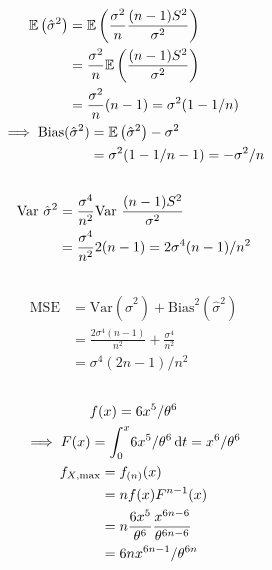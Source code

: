 \documentclass[twocolumn]{article}
\numberwithin{equation}{section}
\begin{document}
\begin{gather*}
\begin{aligned}
\mathbb{E}\left(\hat{\sigma}^2\right)
&=\mathbb{E}\left(\frac{\sigma^2}{n}\frac{(n-1)S^2}{\sigma^2}\right)\\
&=\frac{\sigma^2}{n}\mathbb{E}\left(\frac{(n-1)S^2}{\sigma^2}\right)\\
&=\frac{\sigma^2}{n}(n-1)=\sigma^2(1-1/n)
\end{aligned}\\
\begin{aligned}
\implies \mathrm{Bias}(\hat\sigma^2)&=\mathbb{E}\left(\hat\sigma^2\right)-\sigma^2\\
&=\sigma^2(1-1/n-1)=-\sigma^2/n
\end{aligned}
\end{gather*}

\subsection{}
\begin{align*}
\mathrm{Var}\text{ }\hat\sigma^2
&=\frac{\sigma^4}{n^2}\mathrm{Var}\text{ }\frac{(n-1)S^2}{\sigma^2}\\
&=\frac{\sigma^4}{n^2}2(n-1)=2\sigma^4(n-1)/n^2
\end{align*}

\subsection{}\begin{align*}
\mathrm{MSE}
&=\mathrm{Var}(\hat\sigma^2)+\mathrm{Bias}^2(\hat\sigma^2)\\
&=\frac{2\sigma^4(n-1)}{n^2}+\frac{\sigma^4}{n^2}\\
&=\sigma^4(2n-1)/n^2
\end{align*}

\subsection{}
\begin{gather*}
f(x)=6x^5/\theta^6\\
\implies F(x)=\int_{0}^{x} \! 6x^5/\theta^6 \, \mathrm{d} t=x^6/\theta^6\\
\begin{aligned}
f_{X,\max}
&= f_{(n)}(x)\\
&=nf(x)F^{n-1}(x)\\
&=n\frac{6x^5}{\theta^6}\frac{x^{6n-6}}{\theta^{6n-6}}\\
&=6nx^{6n-1}/\theta^{6n}
\end{aligned}
\end{gather*}
\end{document}
